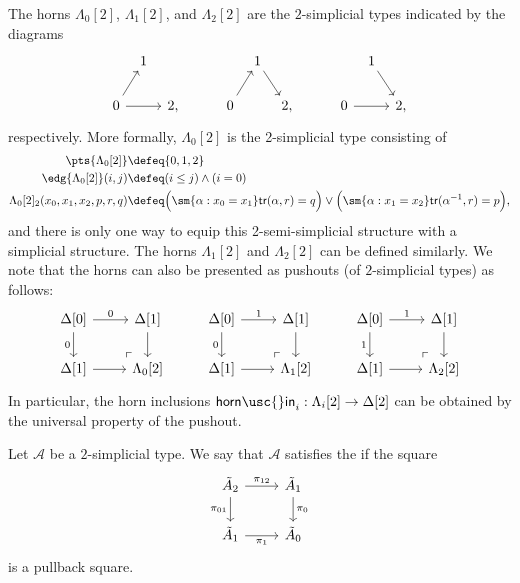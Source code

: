 \begin{eg}
The horns $\Lambda_0[2]$, $\Lambda_1[2]$, and $\Lambda_2[2]$ are the $2$-simplicial types indicated by the diagrams
\begin{equation*}
\begin{tikzcd}[column sep=tiny]
& 1 & &[2em] & 1 \arrow[dr] & &[2em] & 1 \arrow[dr] \\
0 \arrow[ur] \arrow[rr] & & 2, & 0 \arrow[ur] & & 2, & 0 \arrow[rr] & & 2,
\end{tikzcd}
\end{equation*}
respectively. More formally, $\Lambda_0[2]$ is the 2-simplicial type consisting of
\begin{align*}
\pts{\Lambda_0[2]} & \defeq \{0,1,2\} \\
\edg{\Lambda_0[2]}(i,j) & \defeq (i\leq j)\land (i=0) \\
\Lambda_0[2]_2(x_0,x_1,x_2,p,r,q) & \defeq \Big(\sm{\alpha:x_0=x_1}\mathsf{tr}(\alpha,r)=q\Big)\vee\Big(\sm{\alpha:x_1=x_2}\mathsf{tr}(\alpha^{-1},r)=p\Big),
\end{align*}
and there is only one way to equip this 2-semi-simplicial structure with a simplicial structure.
The horns $\Lambda_1[2]$ and $\Lambda_2[2]$ can be defined similarly. We note that the horns can also be presented as pushouts (of $2$-simplicial types) as follows:
\begin{equation*}
\begin{tikzcd}
\Delta[0] \arrow[r,"0"] \arrow[d,swap,"0"] \arrow[dr,phantom,"\ulcorner" at end] & \Delta[1] \arrow[d] & \Delta[0] \arrow[r,"1"] \arrow[d,swap,"0"] \arrow[dr,phantom,"\ulcorner" at end] & \Delta[1] \arrow[d] & \Delta[0] \arrow[r,"1"] \arrow[d,swap,"1"] \arrow[dr,phantom,"\ulcorner" at end] & \Delta[1] \arrow[d] \\
\Delta[1] \arrow[r] & \Lambda_0[2] & \Delta[1] \arrow[r] & \Lambda_1[2] & \Delta[1] \arrow[r] & \Lambda_2[2]
\end{tikzcd}
\end{equation*}
In particular, the horn inclusions $\mathsf{horn\usc{}in}_i:\Lambda_i[2]\to \Delta[2]$ can be obtained by the universal property of the pushout.
\end{eg}

\begin{defn}
Let $\mathcal{A}$ be a $2$-simplicial type. We say that $\mathcal{A}$ satisfies the  if the square
\begin{equation*}
\begin{tikzcd}
\tilde{A}_2 \arrow[r,"\pi_{12}"] \arrow[d,swap,"\pi_{01}"] & \tilde{A}_1 \arrow[d,"\pi_0"] \\
\tilde{A}_1 \arrow[r,swap,"\pi_1"] & \tilde{A}_0
\end{tikzcd}
\end{equation*}
is a pullback square.
\end{defn}

